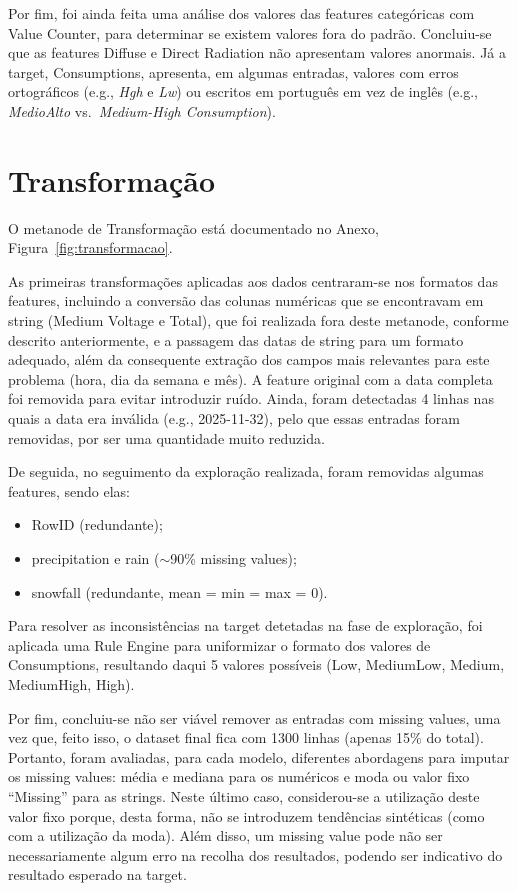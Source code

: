 \documentclass[11pt,a4paper]{article}
\newcommand{\code}[1]{{\ttfamily\hyphenchar\font=45\relax #1}}
\begin{document}
Por fim, foi ainda feita uma análise dos valores das features categóricas com \code{Value Counter}, para determinar se existem valores fora do padrão. Concluiu-se que as features \code{Diffuse} e \code{Direct Radiation} não apresentam valores anormais. Já a target, \code{Consumptions}, apresenta, em algumas entradas, valores com erros ortográficos (e.g., \textit{Hgh} e \textit{Lw}) ou escritos em português em vez de inglês (e.g., \textit{MedioAlto} vs.\ \textit{Medium-High Consumption}).

\section{Transformação}

O metanode de Transformação está documentado no Anexo, Figura~\ref{fig:transformacao}.

As primeiras transformações aplicadas aos dados centraram-se nos formatos das features, incluindo a conversão das colunas numéricas que se encontravam em string (\code{Medium Voltage} e \code{Total}), que foi realizada fora deste metanode, conforme descrito anteriormente, e a passagem das datas de string para um formato adequado, além da consequente extração dos campos mais relevantes para este problema (hora, dia da semana e mês). A feature original com a data completa foi removida para evitar introduzir ruído. Ainda, foram detectadas 4 linhas nas quais a data era inválida (e.g., 2025-11-32), pelo que essas entradas foram removidas, por ser uma quantidade muito reduzida.

De seguida, no seguimento da exploração realizada, foram removidas algumas features, sendo elas:

\begin{itemize}
    \item \code{RowID} (redundante);
    \item \code{precipitation} e \code{rain} ($\sim$90\% missing values);
    \item \code{snowfall} (redundante, mean = min = max = 0).
\end{itemize}

Para resolver as inconsistências na target detetadas na fase de exploração, foi aplicada uma \code{Rule Engine} para uniformizar o formato dos valores de \code{Consumptions}, resultando daqui 5 valores possíveis (Low, MediumLow, Medium, MediumHigh, High).

Por fim, concluiu-se não ser viável remover as entradas com missing values, uma vez que, feito isso, o dataset final fica com 1300 linhas (apenas 15\% do total). Portanto, foram avaliadas, para cada modelo, diferentes abordagens para imputar os missing values: média e mediana para os numéricos e moda ou valor fixo ``Missing'' para as strings. Neste último caso, considerou-se a utilização deste valor fixo porque, desta forma, não se introduzem tendências sintéticas (como com a utilização da moda). Além disso, um missing value pode não ser necessariamente algum erro na recolha dos resultados, podendo ser indicativo do resultado esperado na target.
\end{document}
